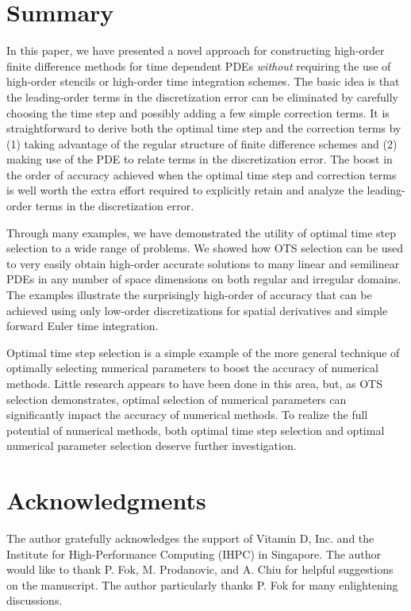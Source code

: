 \documentclass[oneeqnum,onefignum,onetabnum,onethmnum]{siamltex}
\begin{document}
\section{\label{sec:summary} Summary} 
In this paper, we have presented a novel approach for constructing high-order
finite difference methods for time dependent PDEs \emph{without} requiring
the use of high-order stencils or high-order time integration schemes.  
The basic idea is that the leading-order terms in the discretization error
can be eliminated by carefully choosing the time step and possibly adding
a few simple correction terms.  It is straightforward to derive both the 
optimal time step and the correction terms by (1) taking advantage of the 
regular structure of finite difference schemes and (2) making use of the
PDE to relate terms in the discretization error.  The boost in the order
of accuracy achieved when the optimal time step and correction terms is well
worth the extra effort required to explicitly retain and analyze the 
leading-order terms in the discretization error.   

Through many examples, we have demonstrated the utility of optimal time step
selection to a wide range of problems.  We showed how OTS selection can be 
used to very easily obtain high-order accurate solutions to many linear 
and semilinear PDEs in any number of space dimensions on both regular
and irregular domains.  The examples illustrate the surprisingly high-order
of accuracy that can be achieved using only low-order discretizations for 
spatial derivatives and simple forward Euler time integration.

Optimal time step selection is a simple example of the more general technique
of optimally selecting numerical parameters to boost the accuracy of 
numerical methods.  Little research appears to have been done in this area,
but, as OTS selection demonstrates, optimal selection of numerical parameters 
can significantly impact the accuracy of numerical methods.  To realize
the full potential of numerical methods, both optimal time step selection 
and optimal numerical parameter selection deserve further investigation.


\section*{Acknowledgments}
The author gratefully acknowledges the support of Vitamin D, Inc.
and the Institute for High-Performance Computing (IHPC) in Singapore. 
The author would like to thank P. Fok, M. Prodanovic, and A. Chiu for 
helpful suggestions on the manuscript.  The author particularly thanks P. Fok 
for many enlightening discussions. 


\end{document}
